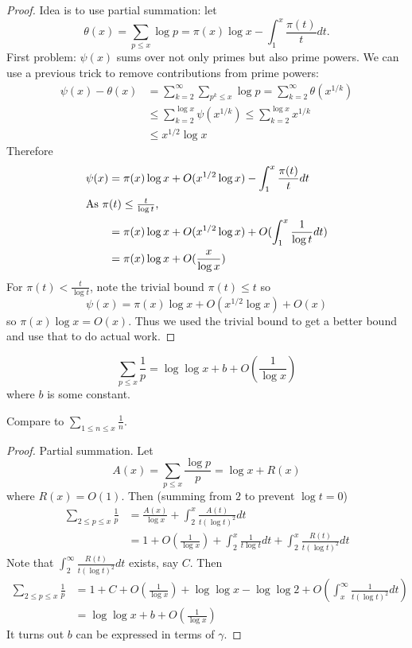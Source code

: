 \documentclass[a4paper]{article}
\begin{document}
\begin{proof}
  Idea is to use partial summation: let
  \[
    \theta(x)
    = \sum_{p \leq x} \log p
    = \pi(x) \log x - \int_1^x \frac{\pi(t)}{t} dt.
  \]
  First problem: \(\psi(x)\) sums over not only primes but also prime powers. We can use a previous trick to remove contributions from prime powers:
  \begin{align*}
    \psi(x) - \theta(x)
    &= \sum_{k = 2}^\infty \sum_{p^k \leq x} \log p
    = \sum_{k = 2}^\infty \theta(x^{1/k}) \\
    &\leq \sum_{k = 2}^{\log x} \psi(x^{1/k})
    \leq \sum_{k = 2}^{\log x} x^{1/k} \\
    &\leq x^{1/2} \log x
  \end{align*}
  Therefore
  \begin{align*}
    \psi(x)
    &= \pi(x) \log x + O(x^{1/2} \log x) - \int_1^x \frac{\pi(t)}{t} dt \\
    \intertext{As \(\pi(t) \leq \frac{t}{\log t}\),}
    &= \pi(x) \log x + O(x^{1/2} \log x) + O(\int_1^x \frac{1}{\log t} dt) \\
    &= \pi(x) \log x + O(\frac{x}{\log x})
  \end{align*}
  For \(\pi(t) < \frac{t}{\log t}\), note the trivial bound \(\pi(t) \leq t\) so
  \[
    \psi(x) = \pi(x) \log x + O(x^{1/2} \log x) + O(x)
  \]
  so \(\pi(x)\log x = O(x)\). Thus we used the trivial bound to get a better bound and use that to do actual work.
\end{proof}

\begin{lemma}
  \[
    \sum_{p \leq x} \frac{1}{p} = \log \log x + b + O(\frac{1}{\log x})
  \]
  where \(b\) is some constant.
\end{lemma}

Compare to \(\sum_{1 \leq n \leq x} \frac{1}{n}\).

\begin{proof}
  Partial summation. Let
  \[
    A(x) = \sum_{p \leq x} \frac{\log p}{p} = \log x + R(x)
  \]
  where \(R(x) = O(1)\). Then (summing from \(2\) to prevent \(\log t = 0\))
  \begin{align*}
    \sum_{2 \leq p \leq x} \frac{1}{p}
    &= \frac{A(x)}{\log x} + \int_2^x \frac{A(t)}{t (\log t)^2} dt \\
    &= 1 + O(\frac{1}{\log x}) + \int_2^x \frac{1}{t \log t} dt + \int_2^x \frac{R(t)}{t(\log t)^2} dt
  \end{align*}
  Note that \(\int_2^\infty \frac{R(t)}{t (\log t)^2} dt\) exists, say \(C\). Then
  \begin{align*}
    \sum_{2 \leq p \leq x} \frac{1}{p}
    &= 1 + C + O(\frac{1}{\log x}) + \log \log x - \log \log 2 + O(\int_x^\infty \frac{1}{t (\log t)^2} dt) \\
    &= \log \log x + b + O(\frac{1}{\log x})
  \end{align*}
  It turns out \(b\) can be expressed in terms of \(\gamma\).
\end{proof}
\end{document}
